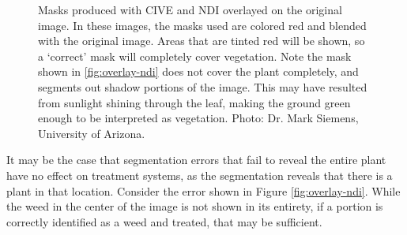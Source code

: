 \documentclass[letterpaper]{report}
\begin{document}
{\begin{figure}[H]
	\centering
	\hfill
	\caption[Masks overlayed on original images]{Masks produced with CIVE and NDI overlayed on the original image. In these images, the masks used are colored red and blended with the original image. Areas that are tinted red will be shown, so a `correct' mask will completely cover vegetation. Note the mask shown in \ref{fig:overlay-ndi} does not cover the plant completely, and segments out shadow portions of the image. This may have resulted from sunlight shining through the leaf, making the ground green enough to be interpreted as vegetation. Photo: Dr. Mark Siemens, University of Arizona.}
	\label{fig:overlay}
\end{figure}

It may be the case that segmentation errors that fail to reveal the entire plant have no effect on treatment systems, as the segmentation reveals that there is a plant in that location.  Consider the error shown in Figure \ref{fig:overlay-ndi}. While the weed in the center of the image is not shown in its entirety, if a portion is correctly identified as a weed and treated, that may be sufficient. 

}
\end{document}
